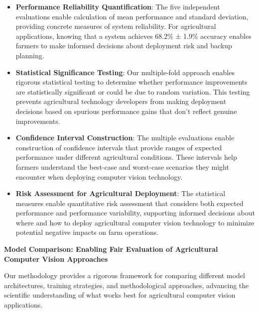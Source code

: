 \begin{itemize}
    \item \textbf{Performance Reliability Quantification}: The five independent evaluations enable calculation of mean performance and standard deviation, providing concrete measures of system reliability. For agricultural applications, knowing that a system achieves 68.2\% ± 1.9\% accuracy enables farmers to make informed decisions about deployment risk and backup planning.
    
    \item \textbf{Statistical Significance Testing}: Our multiple-fold approach enables rigorous statistical testing to determine whether performance improvements are statistically significant or could be due to random variation. This testing prevents agricultural technology developers from making deployment decisions based on spurious performance gains that don't reflect genuine improvements.
    
    \item \textbf{Confidence Interval Construction}: The multiple evaluations enable construction of confidence intervals that provide ranges of expected performance under different agricultural conditions. These intervals help farmers understand the best-case and worst-case scenarios they might encounter when deploying computer vision technology.
    
    \item \textbf{Risk Assessment for Agricultural Deployment}: The statistical measures enable quantitative risk assessment that considers both expected performance and performance variability, supporting informed decisions about where and how to deploy agricultural computer vision technology to minimize potential negative impacts on farm operations.
\end{itemize}

\textbf{Model Comparison: Enabling Fair Evaluation of Agricultural Computer Vision Approaches}

Our methodology provides a rigorous framework for comparing different model architectures, training strategies, and methodological approaches, advancing the scientific understanding of what works best for agricultural computer vision applications.


